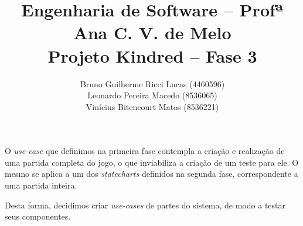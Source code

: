 \documentclass{article}
\title{
    Engenharia de Software -- Profª Ana C. V. de Melo\\
    Projeto Kindred -- Fase 3
}
\author{
    Bruno Guilherme Ricci Lucas (4460596)\\
    Leonardo Pereira Macedo (8536065)\\
    Vinícius Bitencourt Matos (8536221)
}
\begin{document}
\maketitle

O \emph{use-case} que definimos na primeira fase contempla a criação e realização de
uma partida completa do jogo, o que inviabiliza a criação de um teste para ele. O
mesmo se aplica a um dos \emph{statecharts} definidos na segunda fase, correspondente
a uma partida inteira.

Desta forma, decidimos criar \emph{use-cases} de partes do sistema, de modo a testar
seus componentes.
\end{document}

